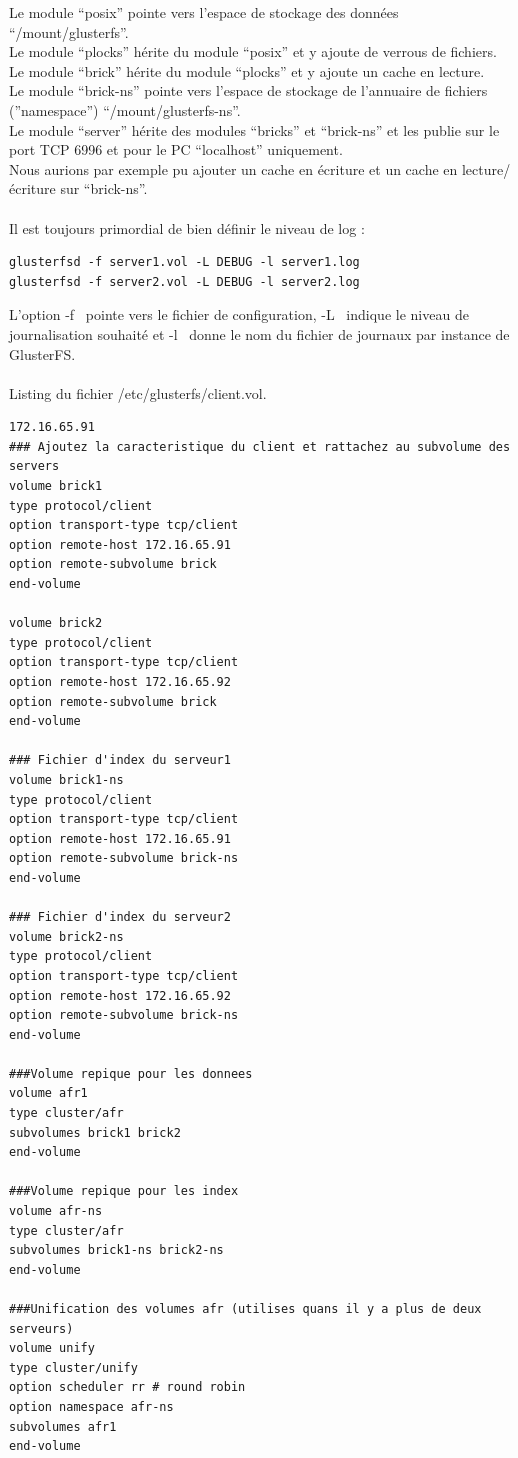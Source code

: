 \documentclass[12pt]{report}
\begin{document}
Le module “posix” pointe vers l'espace de stockage des données “/mount/glusterfs”.\\
Le module “plocks” hérite du module “posix” et y ajoute de verrous de fichiers.\\
Le module “brick” hérite du module “plocks” et y ajoute un cache en lecture.\\
Le module “brick-ns” pointe vers l'espace de stockage de l'annuaire de fichiers (”namespace”) “/mount/glusterfs-ns”.\\
Le module “server” hérite des modules “bricks” et “brick-ns” et les publie sur le port TCP 6996 et pour le PC “localhost” uniquement.\\
Nous aurions par exemple pu ajouter un cache en écriture et un cache en lecture/écriture sur “brick-ns”.\\\\
Il est toujours primordial de bien définir le niveau de log :
\begin{lstlisting}
glusterfsd -f server1.vol -L DEBUG -l server1.log
glusterfsd -f server2.vol -L DEBUG -l server2.log
	  \end{lstlisting}
L'option \og -f\fg~ pointe vers le fichier de configuration, \og -L\fg~  indique le niveau de journalisation souhaité et \og -l\fg~ donne le nom du fichier de journaux par instance de \og GlusterFS\fg.\\\\
\newpage
Listing du fichier /etc/glusterfs/client.vol.
\begin{lstlisting}172.16.65.91
### Ajoutez la caracteristique du client et rattachez au subvolume des servers
volume brick1
type protocol/client
option transport-type tcp/client
option remote-host 172.16.65.91    
option remote-subvolume brick       
end-volume

volume brick2
type protocol/client
option transport-type tcp/client
option remote-host 172.16.65.92
option remote-subvolume brick      
end-volume

### Fichier d'index du serveur1
volume brick1-ns
type protocol/client
option transport-type tcp/client
option remote-host 172.16.65.91 
option remote-subvolume brick-ns  
end-volume

### Fichier d'index du serveur2
volume brick2-ns
type protocol/client
option transport-type tcp/client
option remote-host 172.16.65.92 
option remote-subvolume brick-ns
end-volume
 
###Volume repique pour les donnees
volume afr1
type cluster/afr
subvolumes brick1 brick2
end-volume
 
###Volume repique pour les index
volume afr-ns
type cluster/afr
subvolumes brick1-ns brick2-ns
end-volume
 
###Unification des volumes afr (utilises quans il y a plus de deux serveurs)
volume unify
type cluster/unify
option scheduler rr # round robin
option namespace afr-ns
subvolumes afr1
end-volume
	  \end{lstlisting}
\end{document}
